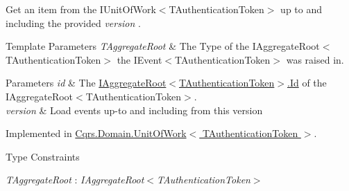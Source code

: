 Get an item from the I\+Unit\+Of\+Work$<$\+T\+Authentication\+Token$>$ up to and including the provided {\itshape version} . 


\begin{DoxyTemplParams}{Template Parameters}
{\em T\+Aggregate\+Root} & The Type of the I\+Aggregate\+Root$<$\+T\+Authentication\+Token$>$ the I\+Event$<$\+T\+Authentication\+Token$>$ was raised in.\\
\hline
\end{DoxyTemplParams}

\begin{DoxyParams}{Parameters}
{\em id} & The \hyperlink{interfaceCqrs_1_1Domain_1_1IAggregateRoot_a04aa3198f1371afa345a58e8fcb713d7_a04aa3198f1371afa345a58e8fcb713d7}{I\+Aggregate\+Root$<$\+T\+Authentication\+Token$>$.\+Id} of the I\+Aggregate\+Root$<$\+T\+Authentication\+Token$>$.\\
\hline
{\em version} & Load events up-\/to and including from this version\\
\hline
\end{DoxyParams}


Implemented in \hyperlink{classCqrs_1_1Domain_1_1UnitOfWork_ab5458f49a206e61b94aaaa4b1ac81911_ab5458f49a206e61b94aaaa4b1ac81911}{Cqrs.\+Domain.\+Unit\+Of\+Work$<$ T\+Authentication\+Token $>$}.

\begin{Desc}
\item[Type Constraints]\begin{description}
\item[{\em T\+Aggregate\+Root} : {\em I\+Aggregate\+Root$<$T\+Authentication\+Token$>$}]\end{description}
\end{Desc}
